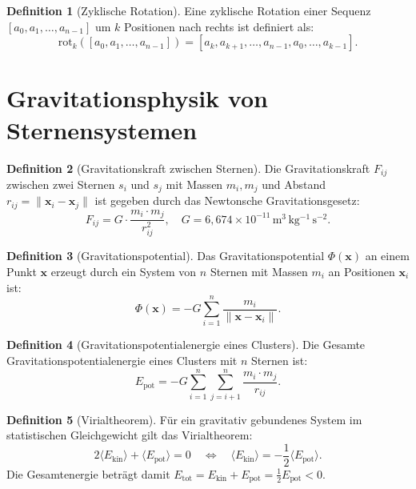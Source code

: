 ﻿\documentclass[a4paper,12pt]{report}
\theoremstyle{definition}
\newtheorem{definition}{Definition}
\begin{document}
\begin{definition}[Zyklische Rotation]
Eine zyklische Rotation einer Sequenz $[a_0, a_1, \ldots, a_{n-1}]$ um $k$ Positionen nach rechts ist definiert als:
\[
\mathrm{rot}_k([a_0, a_1, \ldots, a_{n-1}]) = [a_k, a_{k+1}, \ldots, a_{n-1}, a_0, \ldots, a_{k-1}].
\]
\end{definition}

\section{Gravitationsphysik von Sternensystemen}

\begin{definition}[Gravitationskraft zwischen Sternen]
Die Gravitationskraft $F_{ij}$ zwischen zwei Sternen $s_i$ und $s_j$ mit Massen $m_i, m_j$ und Abstand $r_{ij} = \|\mathbf{x}_i - \mathbf{x}_j\|$ ist gegeben durch das Newtonsche Gravitationsgesetz:
\[
F_{ij} = G \cdot \frac{m_i \cdot m_j}{r_{ij}^2}, \quad G = 6{,}674 \times 10^{-11} \, \mathrm{m^3 \, kg^{-1} \, s^{-2}}.
\]
\end{definition}

\begin{definition}[Gravitationspotential]
Das Gravitationspotential $\Phi(\mathbf{x})$ an einem Punkt $\mathbf{x}$ erzeugt durch ein System von $n$ Sternen mit Massen $m_i$ an Positionen $\mathbf{x}_i$ ist:
\[
\Phi(\mathbf{x}) = -G \sum_{i=1}^{n} \frac{m_i}{\|\mathbf{x} - \mathbf{x}_i\|}.
\]
\end{definition}

\begin{definition}[Gravitationspotentialenergie eines Clusters]
Die Gesamte Gravitationspotentialenergie eines Clusters mit $n$ Sternen ist:
\[
E_\mathrm{pot} = -G \sum_{i=1}^{n} \sum_{j=i+1}^{n} \frac{m_i \cdot m_j}{r_{ij}}.
\]
\end{definition}

\begin{definition}[Virialtheorem]
Für ein gravitativ gebundenes System im statistischen Gleichgewicht gilt das Virialtheorem:
\[
2 \langle E_\mathrm{kin} \rangle + \langle E_\mathrm{pot} \rangle = 0 \quad \Longleftrightarrow \quad \langle E_\mathrm{kin} \rangle = -\frac{1}{2} \langle E_\mathrm{pot} \rangle.
\]
Die Gesamtenergie beträgt damit $E_\mathrm{tot} = E_\mathrm{kin} + E_\mathrm{pot} = \frac{1}{2} E_\mathrm{pot} < 0$.
\end{definition}

\end{document}
